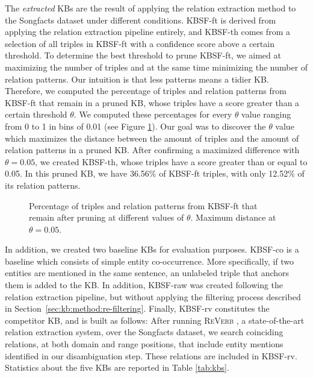 The \textit{extracted} KBs are the result of applying the relation extraction method to the Songfacts dataset under different conditions. \textsc{KBSF}-ft is derived from applying the relation extraction pipeline entirely, and \textsc{KBSF}-th comes from a selection of all triples in \textsc{KBSF}-ft with a confidence score above a certain threshold. To determine the best threshold to prune \textsc{KBSF}-ft, we aimed at maximizing the number of triples and at the same time minimizing the number of relation patterns. Our intuition is that less patterns means a tidier KB. Therefore, we computed the percentage of triples and relation patterns from \textsc{KBSF}-ft that remain in a pruned KB, whose triples have a score greater than a certain threshold $\theta$. We computed these percentages for every $\theta$ value ranging from 0 to 1 in bins of 0.01 (see Figure \ref{fig:kb:th}). Our goal was to discover the $\theta$ value which maximizes the distance between the amount of triples and the amount of relation patterns in a pruned KB. After confirming a maximized difference with $\theta=0.05$, we created \textsc{KBSF}-th, whose triples have a score greater than or equal to 0.05. In this pruned KB, we have 36.56\% of \textsc{KBSF}-ft triples, with only 12.52\% of its relation patterns.

\begin{figure}[!htp]
\centerline{}
\caption[Percentage of triples and relation patterns from \textsc{KBSF}-ft.]{Percentage of triples and relation patterns from \textsc{KBSF}-ft that remain after pruning at different values of $\theta$. Maximum distance at $\theta=0.05$.}
\label{fig:kb:th}
\end{figure}

In addition, we created two baseline KBs for evaluation purposes. \textsc{KBSF}-co is a baseline which consists of simple entity co-occurrence. More specifically, if two entities are mentioned in the same sentence, an unlabeled triple that anchors them is added to the KB. In addition, \textsc{KBSF}-raw was created following the relation extraction pipeline, but without applying the filtering process described in Section~\ref{sec:kb:method:re-filtering}. Finally, \textsc{KBSF}-rv constitutes the competitor KB, and is built as follows: After running \textsc{ReVerb} \citep{Fader2011}, a state-of-the-art relation extraction system, over the Songfacts dataset, we search coinciding relations, at both domain and range positions, that include entity mentions identified in our disambiguation step. These relations are included in KBSF-rv. Statistics about the five KBs are reported in Table \ref{tab:kbs}.

